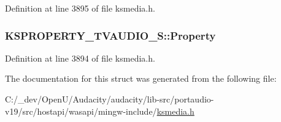 Definition at line 3895 of file ksmedia.\+h.

\subsubsection[{\texorpdfstring{Property}{Property}}]{ K\+S\+P\+R\+O\+P\+E\+R\+T\+Y\+\_\+\+T\+V\+A\+U\+D\+I\+O\+\_\+\+S\+::\+Property}\hypertarget{struct_k_s_p_r_o_p_e_r_t_y___t_v_a_u_d_i_o___s_a2d90a22cf09c4526636f837b7cc46e68}{}\label{struct_k_s_p_r_o_p_e_r_t_y___t_v_a_u_d_i_o___s_a2d90a22cf09c4526636f837b7cc46e68}


Definition at line 3894 of file ksmedia.\+h.



The documentation for this struct was generated from the following file\+:\begin{DoxyCompactItemize}
\item 
C\+:/\+\_\+dev/\+Open\+U/\+Audacity/audacity/lib-\/src/portaudio-\/v19/src/hostapi/wasapi/mingw-\/include/\hyperlink{ksmedia_8h}{ksmedia.\+h}\end{DoxyCompactItemize}
